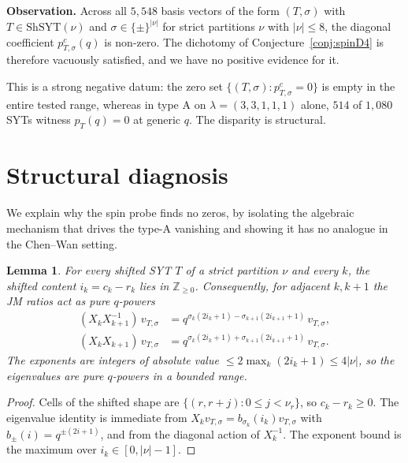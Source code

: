 \documentclass[11pt]{article}
\newtheorem{lemma}{Lemma}
\newcommand{\ShSYT}{\mathrm{ShSYT}}
\begin{document}
\noindent
\textbf{Observation.} Across all $5{,}548$ basis vectors of the form
$(T,\sigma)$ with $T \in \ShSYT(\nu)$ and $\sigma \in \{\pm\}^{|\nu|}$ for
strict partitions $\nu$ with $|\nu| \le 8$, the diagonal coefficient
$p^{c}_{T,\sigma}(q)$ is non-zero. The dichotomy of
Conjecture~\ref{conj:spinD4} is therefore vacuously satisfied, and we have no
positive evidence for it.

This is a strong negative datum: the zero set
$\{(T,\sigma) : p^{c}_{T,\sigma} = 0\}$ is empty in the entire tested range,
whereas in type A on $\lambda = (3,3,1,1,1)$ alone, $514$ of $1{,}080$ SYTs
witness $p_T(q) = 0$ at generic $q$. The disparity is structural.

\section{Structural diagnosis}

We explain why the spin probe finds no zeros, by isolating the algebraic
mechanism that drives the type-A vanishing and showing it has no analogue
in the Chen--Wan setting.

\begin{lemma}
\label{lem:nonneg-contents}
For every shifted SYT $T$ of a strict partition $\nu$ and every $k$, the
shifted content $i_k = c_k - r_k$ lies in $\mathbb{Z}_{\ge 0}$. Consequently,
for adjacent $k, k+1$ the JM ratios act as pure $q$-powers
\begin{align*}
(X_k X_{k+1}^{-1})\, v_{T,\sigma}
&= q^{\sigma_k (2 i_k + 1) - \sigma_{k+1}(2 i_{k+1} + 1)}\, v_{T,\sigma}, \\
(X_k X_{k+1})\, v_{T,\sigma}
&= q^{\sigma_k (2 i_k + 1) + \sigma_{k+1}(2 i_{k+1} + 1)}\, v_{T,\sigma}.
\end{align*}
The exponents are integers of absolute value $\le 2 \max_k(2 i_k + 1)
\le 4|\nu|$, so the eigenvalues are pure $q$-powers in a bounded range.
\end{lemma}

\begin{proof}
Cells of the shifted shape are $\{(r, r + j) : 0 \le j < \nu_r\}$, so
$c_k - r_k \ge 0$. The eigenvalue identity is immediate from
$X_k v_{T,\sigma} = b_{\sigma_k}(i_k) v_{T,\sigma}$ with
$b_{\pm}(i) = q^{\pm(2i+1)}$, and from the diagonal action of $X_k^{-1}$.
The exponent bound is the maximum over $i_k \in [0, |\nu|-1]$.
\end{proof}
\end{document}
